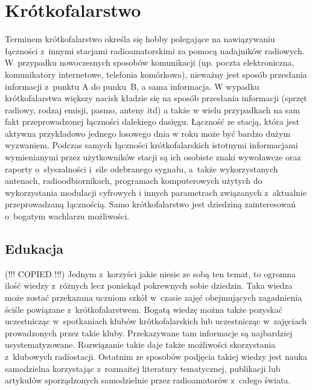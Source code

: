 \documentclass[]{mgr}
\begin{document}
        \section{Krótkofalarstwo}
        Terminem krótkofalarstwo określa się hobby polegające na nawiązywaniu łączności z~innymi stacjami radioamatorskimi za pomocą nadajników radiowych. W~przypadku nowoczesnych sposobów komunikacji (np. poczta elektroniczna, komunikatory internetowe, telefonia komórkowa), nieważny jest sposób przesłania informacji z~punktu A do punku~B, a sama informacja. W wypadku krótkofalarstwa większy nacisk kładzie się na sposób przesłania informacji (sprzęt radiowy, rodzaj emisji, pasmo, anteny itd) a także w wielu przypadkach na sam fakt przeprowadzonej łączności dalekiego dasięgu. Łączność ze stacją, która jest aktywna przykładowo jednego losowego dnia w roku może być bardzo dużym wyzwaniem. Podczas samych łączności krótkofalarskich istotnymi informacjami wymienianymi przez użytkowników stacji są ich osobiste znaki wywoławcze oraz raporty o~słyszalności i~sile odebranego sygnału, a~także wykorzystanych antenach, radioodbiornikach, programach komputerowych użytych do wykorzystania modulacji cyfrowych i innych parametrach związanych z~aktualnie przeprowadzaną łącznością. Samo krótkofalarstwo jest dziedziną zainteresowań o~bogatym wachlarzu możliwości.

            \subsection{Edukacja}
            (!!! COPIED !!!) Jednym z~korzyści jakie niesie ze sobą ten temat, to ogromna ilość wiedzy z~różnych lecz poniekąd pokrewnych sobie dziedzin. Taka wiedza może zostać przekazana uczniom szkół w~czasie zajęć obejmujących zagadnienia ściśle powiązane z~krótkofalarstwem. Bogatą wiedzę można także pozyskać uczestnicząc w~spotkaniach klubów krótkofalarskich lub uczestnicząc w~zajęciach prowadzonych przez takie kluby. Przekazywane tam informacje są najbardziej usystematyzowane. Rozwiązanie takie daje także możliwości skorzystania z~klubowych radiostacji. Ostatnim ze sposobów podjęcia takiej wiedzy jest nauka samodzielna korzystając z~rozmaitej literatury tematycznej, publikacji lub artykułów sporządzonych samodzielnie przez radioamatorów z~całego świata.
\end{document}
